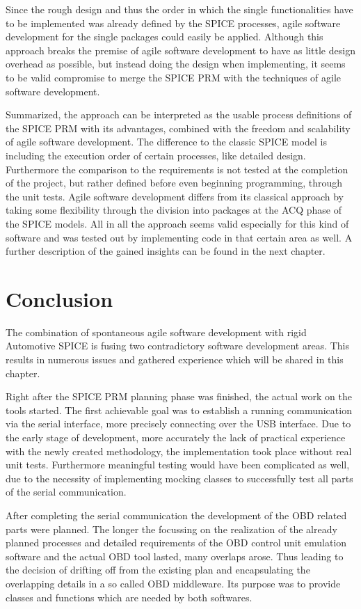 Since the rough design and thus the order in which the single functionalities have to be implemented was already defined by the SPICE processes,
agile software development for the single packages could easily be applied. Although this approach breaks the premise of agile software 
development to have as little design overhead as possible, but instead doing the design when implementing, it seems to be valid compromise to 
merge the SPICE PRM with the techniques of agile software development. 

Summarized, the approach can be interpreted as the usable process definitions of the SPICE PRM with its advantages, combined with the freedom 
and scalability of agile software development. The difference to the classic SPICE model is including the execution order of certain processes, 
like detailed design. Furthermore the comparison to the requirements is not tested at the completion of the project, but rather defined before 
even beginning programming, through the unit tests. Agile software development differs from its classical approach by taking some flexibility 
through the division into packages at the ACQ phase of the SPICE models. All in all the approach seems valid especially for this kind of 
software and was tested out by implementing code in that certain area as well. A further description of the gained insights can be found in the 
next chapter. 

\section{Conclusion}

The combination of spontaneous agile software development with rigid Automotive SPICE is fusing two contradictory software development areas. 
This results in numerous issues and gathered experience which will be shared in this chapter.

Right after the SPICE PRM planning phase was finished, the actual work on the tools started. The first achievable goal was to establish a 
running communication via the serial interface, more precisely connecting over the USB interface. Due to the early stage of development, more 
accurately the lack of practical experience with the newly created methodology, the implementation took place without real unit tests. 
Furthermore meaningful testing would have been complicated as well, due to the necessity of implementing mocking classes to successfully test 
all parts of the serial communication.

After completing the serial communication the development of the OBD related parts were planned. The longer the focussing on the realization of 
the already planned processes and detailed requirements of the OBD control unit emulation software and the actual OBD tool lasted, many overlaps 
arose. Thus leading to the decision of drifting off from the existing plan and encapsulating the overlapping details in a so called OBD 
middleware. Its purpose was to provide classes and functions which are needed by both softwares.

